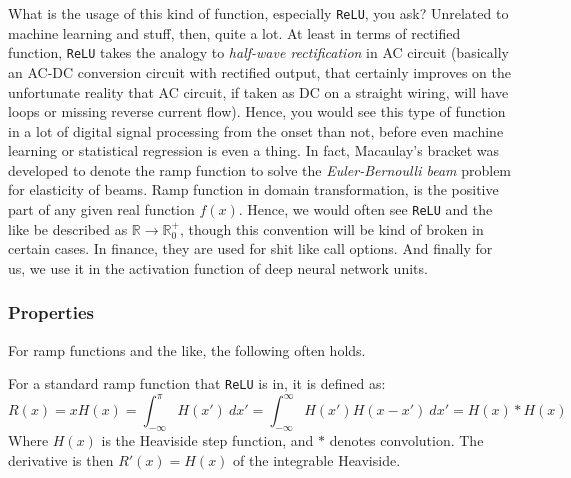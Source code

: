 What is the usage of this kind of function, especially \texttt{ReLU}, you ask? Unrelated to machine learning and stuff, then, quite a lot. At least in terms of rectified function, \texttt{ReLU} takes the analogy to \textit{half-wave rectification} in AC circuit (basically an AC-DC conversion circuit with rectified output, that certainly improves on the unfortunate reality that AC circuit, if taken as DC on a straight wiring, will have loops or missing reverse current flow). Hence, you would see this type of function in a lot of digital signal processing from the onset than not, before even machine learning or statistical regression is even a thing. In fact, Macaulay's bracket was developed to denote the ramp function to solve the \textit{Euler-Bernoulli beam} problem for elasticity of beams. Ramp function in domain transformation, is the positive part of any given real function $f(x)$. Hence, we would often see \texttt{ReLU} and the like be described as $\mathbb{R}\to\mathbb{R}_{0}^{+}$, though this convention will be kind of broken in certain cases. In finance, they are used for shit like call options. And finally for us, we use it in the activation function of deep neural network units. 

\subsubsection{Properties}

For ramp functions and the like, the following often holds. 
\begin{definition}[Properties]
    For a standard ramp function that \texttt{ReLU} is in, it is defined as: 
    \begin{equation}
        R(x)=xH(x) = \int^{\pi}_{-\infty} H(x') \: dx' = \int_{-\infty}^{\infty} H(x')H(x-x')\:dx'=H(x) * H(x)
    \end{equation}
    Where $H(x)$ is the Heaviside step function, and $*$ denotes convolution. The derivative is then $R'(x)=H(x)$ of the integrable Heaviside. 
\end{definition}

